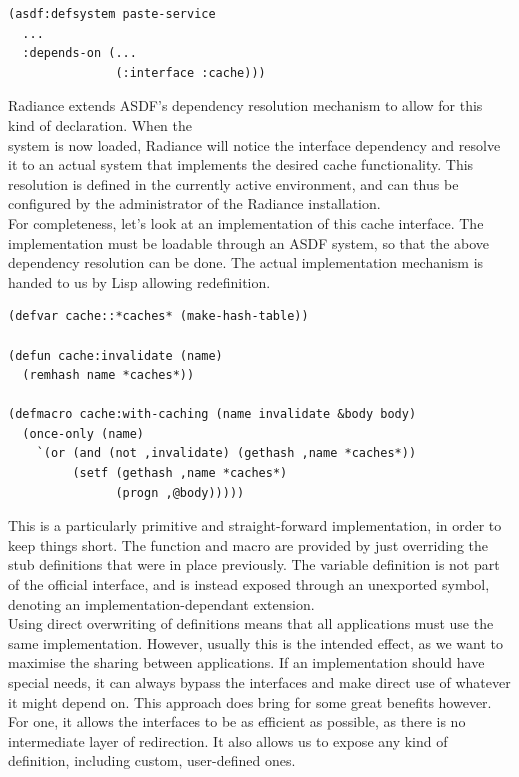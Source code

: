 \documentclass{sig-alternate}
\begin{document}
\begin{verbatim}
(asdf:defsystem paste-service
  ...
  :depends-on (...
               (:interface :cache)))
\end{verbatim}

Radiance extends ASDF's dependency resolution mechanism to allow for this kind of declaration. When the \\ system is now loaded, Radiance will notice the interface dependency and resolve it to an actual system that implements the desired cache functionality. This resolution is defined in the currently active environment, and can thus be configured by the administrator of the Radiance installation. \\

For completeness, let's look at an implementation of this cache interface. The implementation must be loadable through an ASDF system, so that the above dependency resolution can be done. The actual implementation mechanism is handed to us by Lisp allowing redefinition.

\begin{verbatim}
(defvar cache::*caches* (make-hash-table))

(defun cache:invalidate (name)
  (remhash name *caches*))

(defmacro cache:with-caching (name invalidate &body body)
  (once-only (name)
    `(or (and (not ,invalidate) (gethash ,name *caches*))
         (setf (gethash ,name *caches*)
               (progn ,@body)))))
\end{verbatim}

This is a particularly primitive and straight-forward implementation, in order to keep things short. The function and macro are provided by just overriding the stub definitions that were in place previously. The variable definition is not part of the official interface, and is instead exposed through an unexported symbol, denoting an implementation-dependant extension. \\

Using direct overwriting of definitions means that all applications must use the same implementation. However, usually this is the intended effect, as we want to maximise the sharing between applications. If an implementation should have special needs, it can always bypass the interfaces and make direct use of whatever it might depend on. This approach does bring for some great benefits however. For one, it allows the interfaces to be as efficient as possible, as there is no intermediate layer of redirection. It also allows us to expose any kind of definition, including custom, user-defined ones. \\
\end{document}
